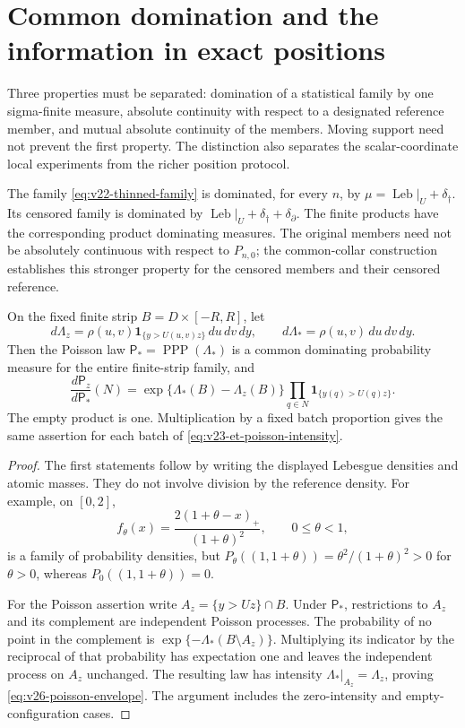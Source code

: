 \section{Common domination and the information in exact positions}
\label{sec:v27-domination}
\label{sec:v26-domination}

Three properties must be separated: domination of a statistical family by
one sigma-finite measure, absolute continuity with respect to a designated
reference member, and mutual absolute continuity of the members.  Moving
support need not prevent the first property.  The distinction also separates
the scalar-coordinate local experiments from the richer position protocol.

\begin{proposition}
\label{prop:v26-common-domination}
The family \eqref{eq:v22-thinned-family} is dominated, for every \(n\), by
\(\mu=\operatorname{Leb}|_U+\delta_\dagger\).  Its censored family is
dominated by \(\operatorname{Leb}|_U+\delta_\dagger+\delta_\partial\).
The finite products have the corresponding product dominating measures.
The original members need not be absolutely continuous with respect to
\(P_{n,0}\); the common-collar construction establishes this stronger
property for the censored members and their censored reference.

On the fixed finite strip \(B=D\times[-R,R]\), let
\[
 d\Lambda_z=\rho(u,v)\mathbf1_{\{y>U(u,v)z\}}\,du\,dv\,dy,
 \qquad d\Lambda_* =\rho(u,v)\,du\,dv\,dy.
\]
Then the Poisson law \(\mathsf P_* =\operatorname{PPP}(\Lambda_*)\) is a
common dominating probability measure for the entire finite-strip family,
and
\begin{equation}\label{eq:v26-poisson-envelope}
 \frac{d\mathsf P_z}{d\mathsf P_*}(N)
 =\exp\{\Lambda_*(B)-\Lambda_z(B)\}
           \prod_{q\in N}\mathbf1_{\{y(q)>U(q)z\}}.
\end{equation}
The empty product is one.  Multiplication by a fixed batch proportion gives
the same assertion for each batch of \eqref{eq:v23-et-poisson-intensity}.
\end{proposition}

\begin{proof}
The first statements follow by writing the displayed Lebesgue densities
and atomic masses.  They do not involve division by the reference density.
For example, on \([0,2]\),
\[
 f_\theta(x)=\frac{2(1+\theta-x)_+}{(1+\theta)^2},\qquad 0\le\theta<1,
\]
is a family of probability densities, but
\(P_\theta((1,1+\theta))=\theta^2/(1+\theta)^2>0\) for \(\theta>0\),
whereas \(P_0((1,1+\theta))=0\).

For the Poisson assertion write \(A_z=\{y>Uz\}\cap B\).  Under
\(\mathsf P_*\), restrictions to \(A_z\) and its complement are
independent Poisson processes.  The probability of no point in the
complement is \(\exp\{-\Lambda_*(B\setminus A_z)\}\).  Multiplying its
indicator by the reciprocal of that probability has expectation one and
leaves the independent process on \(A_z\) unchanged.  The resulting law
has intensity \(\Lambda_*|_{A_z}=\Lambda_z\), proving
\eqref{eq:v26-poisson-envelope}.  The argument includes the zero-intensity
and empty-configuration cases.
\end{proof}

